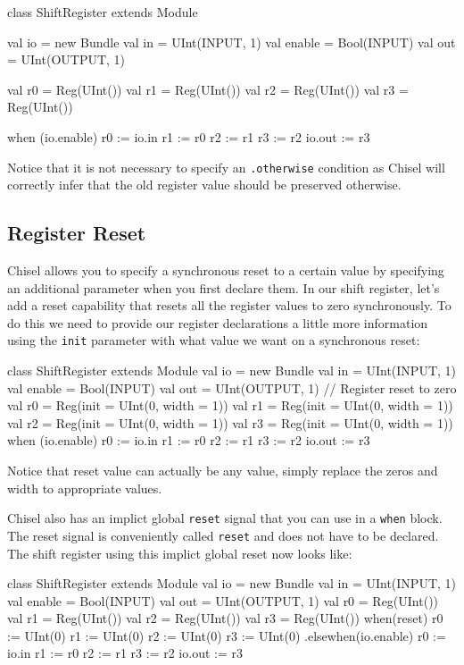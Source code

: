 \documentclass[twocolumn, 10pt]{article}
\begin{document}
\begin{scala}
class ShiftRegister extends Module {
  val io = new Bundle {
    val in     = UInt(INPUT, 1)
    val enable = Bool(INPUT)
    val out    = UInt(OUTPUT, 1)
  }

  val r0 = Reg(UInt())
  val r1 = Reg(UInt())
  val r2 = Reg(UInt())
  val r3 = Reg(UInt())

  when (io.enable) {
    r0 := io.in
    r1 := r0
    r2 := r1
    r3 := r2
  }
  io.out := r3
}
\end{scala}

Notice that it is not necessary to specify an \verb+.otherwise+ condition as Chisel will correctly infer that the old register value should be preserved otherwise.

\subsection{Register Reset}

Chisel allows you to specify a synchronous reset to a certain value by specifying an additional parameter when you first declare them. In our shift register, let's add a reset capability that resets all the register values to zero synchronously. To do this we need to provide our register declarations a little more information using the \verb+init+ parameter with what value we want on a synchronous reset:

\begin{scala}
class ShiftRegister extends Module {
  val io = new Bundle {
    val in     = UInt(INPUT, 1)
    val enable = Bool(INPUT)
    val out    = UInt(OUTPUT, 1)
  }
  // Register reset to zero
  val r0 = Reg(init = UInt(0, width = 1))
  val r1 = Reg(init = UInt(0, width = 1))
  val r2 = Reg(init = UInt(0, width = 1))
  val r3 = Reg(init = UInt(0, width = 1))
  when (io.enable) {
    r0 := io.in
    r1 := r0
    r2 := r1
    r3 := r2
  }
  io.out := r3
}
\end{scala}

Notice that reset value can actually be any value, simply replace the zeros and width to appropriate values.

Chisel also has an implict global \verb+reset+ signal that you can use in a \verb+when+ block. The reset signal is conveniently called \verb+reset+ and does not have to be declared. The shift register using this implict global reset now looks like:

\begin{scala}
class ShiftRegister extends Module {
  val io = new Bundle {
    val in     = UInt(INPUT, 1)
    val enable = Bool(INPUT)
    val out    = UInt(OUTPUT, 1)
  }
  val r0 = Reg(UInt())
  val r1 = Reg(UInt())
  val r2 = Reg(UInt())
  val r3 = Reg(UInt())
  when(reset) {
    r0 := UInt(0)
    r1 := UInt(0)
    r2 := UInt(0)
    r3 := UInt(0)
  } .elsewhen(io.enable) {
    r0 := io.in
    r1 := r0
    r2 := r1
    r3 := r2
  }
  io.out := r3
}
\end{scala}
\end{document}
